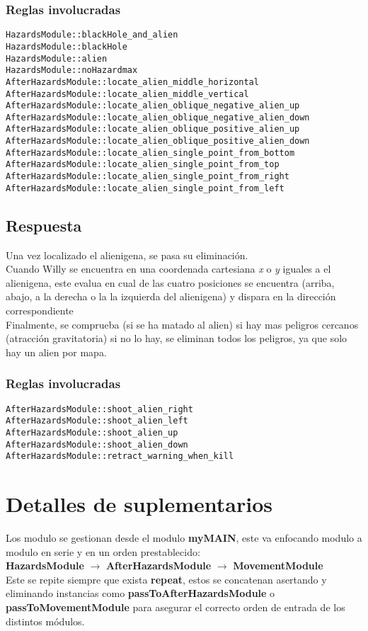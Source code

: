 \documentclass[a4paper,10pt]{article}
\begin{document}
\subsubsection{Reglas involucradas}
\footnotesize
\begin{lstlisting}
HazardsModule::blackHole_and_alien
HazardsModule::blackHole
HazardsModule::alien
HazardsModule::noHazardmax
AfterHazardsModule::locate_alien_middle_horizontal
AfterHazardsModule::locate_alien_middle_vertical
AfterHazardsModule::locate_alien_oblique_negative_alien_up
AfterHazardsModule::locate_alien_oblique_negative_alien_down
AfterHazardsModule::locate_alien_oblique_positive_alien_up
AfterHazardsModule::locate_alien_oblique_positive_alien_down
AfterHazardsModule::locate_alien_single_point_from_bottom
AfterHazardsModule::locate_alien_single_point_from_top
AfterHazardsModule::locate_alien_single_point_from_right
AfterHazardsModule::locate_alien_single_point_from_left
\end{lstlisting}
\normalsize

\subsection{Respuesta}
Una vez localizado el alienigena, se pasa su eliminación.
\vspace{0.5 cm}\\
Cuando Willy se encuentra en una coordenada cartesiana {\it x} o {\it y} iguales a el alienigena, este evalua en cual de las cuatro posiciones se encuentra (arriba, abajo, a la derecha o la la izquierda del alienigena) y dispara en la dirección correspondiente
\vspace{0.5 cm}\\
Finalmente, se comprueba (si se ha matado al alien) si hay mas peligros cercanos (atracción gravitatoria) si no lo hay, se eliminan todos los peligros, ya que solo hay un alien por mapa.
\subsubsection{Reglas involucradas}
\footnotesize
\begin{lstlisting}
AfterHazardsModule::shoot_alien_right
AfterHazardsModule::shoot_alien_left
AfterHazardsModule::shoot_alien_up
AfterHazardsModule::shoot_alien_down
AfterHazardsModule::retract_warning_when_kill
\end{lstlisting}
\normalsize
\pagebreak


\section{Detalles de suplementarios}
Los modulo se gestionan desde el modulo {\bf myMAIN}, este va enfocando modulo a modulo en serie y en un orden prestablecido:
\\{\bf HazardsModule} $\rightarrow$ {\bf AfterHazardsModule} $\rightarrow$ {\bf MovementModule}\\
Este se repite siempre que exista {\bf repeat}, estos se concatenan asertando y eliminando instancias como {\bf passToAfterHazardsModule} o {\bf passToMovementModule} para asegurar el correcto orden de entrada de los distintos módulos.
\end{document}
